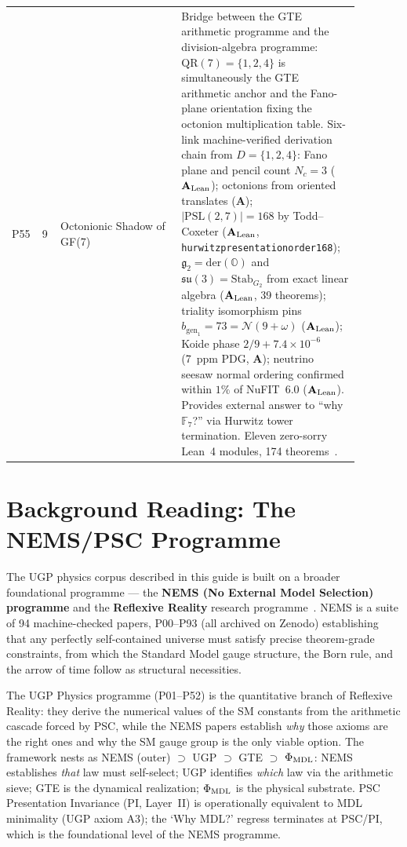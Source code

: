 \documentclass[11pt]{article}
\newcommand{\lean}[1]{%
  \penalty-100
  \begingroup\def\_{{\textunderscore\allowbreak}}\texttt{#1}\endgroup}
\newcommand{\CatAL}{\ensuremath{\textbf{A}_{\rm Lean}}}
\newcommand{\CatA}{\textbf{A}}
\begin{document}
\begin{longtable}{@{}P{0.05\linewidth}P{0.05\linewidth}P{0.33\linewidth}P{0.45\linewidth}@{}}
P55 & 9 & Octonionic Shadow of GF(7) & Bridge between the GTE arithmetic programme and the division-algebra programme: $\mathrm{QR}(7)=\{1,2,4\}$ is simultaneously the GTE arithmetic anchor and the Fano-plane orientation fixing the octonion multiplication table. Six-link machine-verified derivation chain from $D=\{1,2,4\}$: Fano plane and pencil count $N_c=3$ (\CatAL); octonions from oriented translates (\CatA); $|\mathrm{PSL}(2,7)|=168$ by Todd--Coxeter (\CatAL, \lean{hurwitz\_presentation\_order\_168}); $\mathfrak{g}_2=\mathrm{der}(\mathbb{O})$ and $\mathfrak{su}(3)=\mathrm{Stab}_{G_2}$ from exact linear algebra (\CatAL, 39 theorems); triality isomorphism pins $b_{\mathrm{gen}_1}=73=\mathcal{N}(9+\omega)$ (\CatAL); Koide phase $2/9+7.4\times10^{-6}$ (7~ppm PDG, \CatA); neutrino seesaw normal ordering confirmed within $1\%$ of NuFIT~6.0 (\CatAL). Provides external answer to ``why $\mathbb{F}_7$?'' via Hurwitz tower termination. Eleven zero-sorry Lean~4 modules, 174 theorems~\cite{SpivackOctonionicShadow}. \\
\end{longtable}

\section{Background Reading: The NEMS/PSC Programme}
\label{sec:nems_background}

The UGP physics corpus described in this guide is built on a broader foundational
programme --- the \textbf{NEMS (No External Model Selection) programme} and the
\textbf{Reflexive Reality} research programme~\cite{SpivackResearchProgrammes}.
NEMS is a suite of 94 machine-checked papers, P00--P93 (all archived on Zenodo)
establishing that any perfectly self-contained universe must satisfy precise
theorem-grade constraints, from which the Standard Model gauge structure,
the Born rule, and the arrow of time follow as structural necessities.

The UGP Physics programme (P01--P52) is the quantitative branch of Reflexive Reality: they derive the numerical values of the SM constants
from the arithmetic cascade forced by PSC, while the NEMS papers establish
\emph{why} those axioms are the right ones and why the SM gauge group is the
only viable option.  The framework nests as NEMS (outer) $\supset$ UGP $\supset$ GTE $\supset$ $\Phi_{\rm MDL}$:
NEMS establishes \emph{that} law must self-select; UGP identifies \emph{which} law via the arithmetic sieve; GTE is the dynamical realization; $\Phi_{\rm MDL}$ is the physical substrate.  PSC Presentation Invariance (PI, Layer~II) is operationally equivalent to MDL minimality (UGP axiom A3); the `Why MDL?' regress terminates at PSC/PI, which is the foundational level of the NEMS programme.
\end{document}
